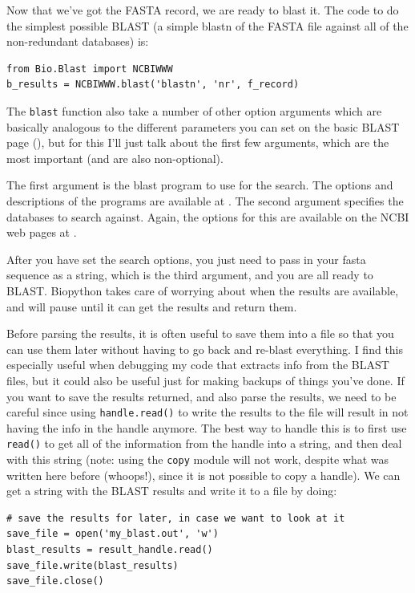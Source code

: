 \documentclass{report}
\begin{document}
Now that we've got the FASTA record, we are ready to blast it. The
code to do the simplest possible BLAST (a simple blastn of the
FASTA file against all of the non-redundant databases) is:

\begin{verbatim}
from Bio.Blast import NCBIWWW
b_results = NCBIWWW.blast('blastn', 'nr', f_record)
\end{verbatim}

The \verb|blast| function also take a number of other option arguments
which are basically analogous to the different parameters you can set
on the basic BLAST page
(),
but for this I'll just talk about the first few arguments, which are
the most important (and are also non-optional).


The first argument is the blast program to use for the search. The
options and descriptions of the programs are available at
.
The second argument specifies the databases to search against. Again,
the options for this are available on the NCBI web pages at
.


After you have set the search options, you just need to pass in your
fasta sequence as a string, which is the third argument, and you are
all ready to BLAST. Biopython takes care of worrying about when the
results are available, and will pause until it can get the results and
return them.


Before parsing the results, it is often useful to save them into a
file so that you can use them later without having to go back and
re-blast everything. I find this especially useful when debugging my
code that extracts info from the BLAST files, but it could also be
useful just for making backups of things you've done. If you want to
save the results returned, and also parse the results, we need to be
careful since using \verb|handle.read()| to write the results to the
file will result in not having the info in the handle anymore. The
best way to handle this is to first use \verb|read()| to get all of
the information from the handle into a string, and then deal with this 
string (note: using the \verb|copy| module will not work, despite what 
was written here before (whoops!), since it is not possible to copy a
handle). We can get a string with the BLAST results and write it to a
file by doing:

\begin{verbatim}
# save the results for later, in case we want to look at it
save_file = open('my_blast.out', 'w')
blast_results = result_handle.read()
save_file.write(blast_results)
save_file.close()
\end{verbatim}
\end{document}

